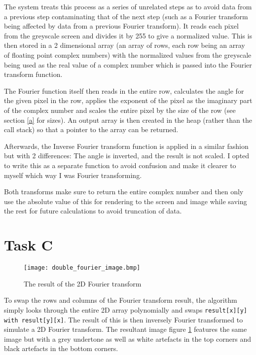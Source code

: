 \documentclass{article}
\begin{document}
The system treats this process as a series of unrelated steps as to avoid data from a previous step contaminating that of the next step (such as a Fourier transform being affected by data from a previous Fourier transform). It reads each pixel from the greyscale screen and divides it by 255 to give a normalized value. This is then stored in a 2 dimensional array (an array of rows, each row being an array of floating point complex numbers) with the normalized values from the greyscale being used as the real value of a complex number which is passed into the Fourier transform function.

The Fourier function itself then reads in the entire row, calculates the angle for the given pixel in the row, applies the exponent of the pixel as the imaginary part of the complex number and scales the entire pixel by the size of the row (see section \ref{a} for sizes). An output array is then created in the heap (rather than the call stack) so that a pointer to the array can be returned.

Afterwards, the Inverse Fourier transform function is applied in a similar fashion but with 2 differences: The angle is inverted, and the result is not scaled. I opted to write this as a separate function to avoid confusion and make it clearer to myself which way I was Fourier transforming.

Both transforms make sure to return the entire complex number and then only use the absolute value of this for rendering to the screen and image while saving the rest for future calculations to avoid truncation of data.

\section{Task C} \label{c}

\begin{figure}[h]
    \centering
    \caption{The result of the 2D Fourier transform}
    \label{fig:2d}
    \texttt{[image: double\_fourier\_image.bmp]}
\end{figure}

To swap the rows and columns of the Fourier transform result, the algorithm simply looks through the entire 2D array polynomially and swaps \verb|result[x][y] with result[y][x]|. The result of this is then inversely Fourier transformed to simulate a 2D Fourier transform. The resultant image figure \ref{fig:2d} features the same image but with a grey undertone as well as white artefacts in the top corners and black artefacts in the bottom corners.
\end{document}
